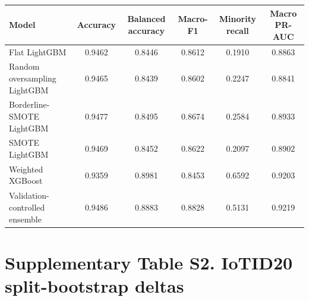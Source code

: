 \documentclass[10pt]{article}
\begin{document}
\begin{center}
\scriptsize
\begin{tabular}{lccccc}
\toprule
Model & Accuracy & Balanced accuracy & Macro-F1 & Minority recall & Macro PR-AUC \\
\midrule
Flat LightGBM & 0.9462 & 0.8446 & 0.8612 & 0.1910 & 0.8863 \\
Random oversampling LightGBM & 0.9465 & 0.8439 & 0.8602 & 0.2247 & 0.8841 \\
Borderline-SMOTE LightGBM & 0.9477 & 0.8495 & 0.8674 & 0.2584 & 0.8933 \\
SMOTE LightGBM & 0.9469 & 0.8452 & 0.8622 & 0.2097 & 0.8902 \\
Weighted XGBoost & 0.9359 & 0.8981 & 0.8453 & 0.6592 & 0.9203 \\
Validation-controlled ensemble & 0.9486 & 0.8883 & 0.8828 & 0.5131 & 0.9219 \\
\bottomrule
\end{tabular}
\end{center}

\section*{Supplementary Table S2. IoTID20 split-bootstrap deltas}
\end{document}
